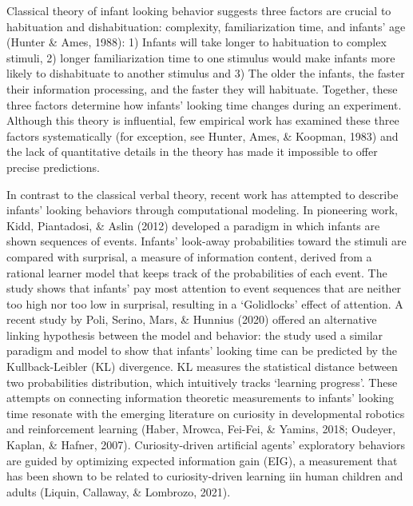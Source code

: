 \documentclass[10pt, letterpaper]{article}
\begin{document}
Classical theory of infant looking behavior suggests three factors are
crucial to habituation and dishabituation: complexity, familiarization
time, and infants' age (Hunter \& Ames, 1988): 1) Infants will take
longer to habituation to complex stimuli, 2) longer familiarization time
to one stimulus would make infants more likely to dishabituate to
another stimulus and 3) The older the infants, the faster their
information processing, and the faster they will habituate. Together,
these three factors determine how infants' looking time changes during
an experiment. Although this theory is influential, few empirical work
has examined these three factors systematically (for exception, see
Hunter, Ames, \& Koopman, 1983) and the lack of quantitative details in
the theory has made it impossible to offer precise predictions.

In contrast to the classical verbal theory, recent work has attempted to
describe infants' looking behaviors through computational modeling. In
pioneering work, Kidd, Piantadosi, \& Aslin (2012) developed a paradigm
in which infants are shown sequences of events. Infants' look-away
probabilities toward the stimuli are compared with surprisal, a measure
of information content, derived from a rational learner model that keeps
track of the probabilities of each event. The study shows that infants'
pay most attention to event sequences that are neither too high nor too
low in surprisal, resulting in a `Golidlocks' effect of attention. A
recent study by Poli, Serino, Mars, \& Hunnius (2020) offered an
alternative linking hypothesis between the model and behavior: the study
used a similar paradigm and model to show that infants' looking time can
be predicted by the Kullback-Leibler (KL) divergence. KL measures the
statistical distance between two probabilities distribution, which
intuitively tracks `learning progress'. These attempts on connecting
information theoretic measurements to infants' looking time resonate
with the emerging literature on curiosity in developmental robotics and
reinforcement learning (Haber, Mrowca, Fei-Fei, \& Yamins, 2018;
Oudeyer, Kaplan, \& Hafner, 2007). Curiosity-driven artificial agents'
exploratory behaviors are guided by optimizing expected information gain
(EIG), a measurement that has been shown to be related to
curiosity-driven learning iin human children and adults (Liquin,
Callaway, \& Lombrozo, 2021).
\end{document}
